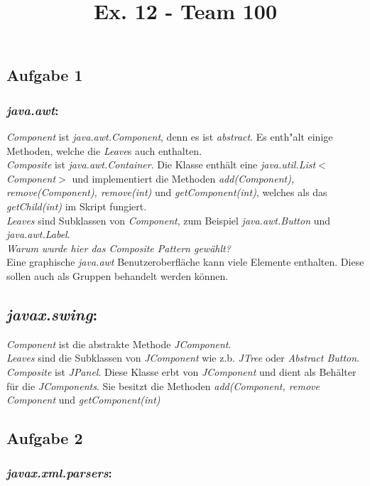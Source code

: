 \documentclass[a4paper]{article}
\title{Ex. 12 - Team 100}
\begin{document}
	\maketitle
\subsection*{Aufgabe 1}
\subsubsection*{\textit{java.awt}:}
\textit{Component} ist \textit{java.awt.Component}, denn es ist \textit{abstract}. Es enth"alt einige Methoden, welche die \textit{Leave}s auch enthalten. \\
\textit{Composite} ist \textit{java.awt.Container}. Die Klasse enthält eine \textit{java.util.List}$<$\textit{Component}$>$ und implementiert die 
Methoden \textit{add(Component), remove(Component), remove(int)} und \textit{getComponent(int)}, welches als das \textit{getChild(int)} im Skript fungiert. \\
\textit{Leaves} sind Subklassen von \textit{Component}, zum Beispiel \textit{java.awt.Button} und \textit{java.awt.Label}.\\
\emph{Warum wurde hier das \textit{Composite Pattern} gewählt?} \\
Eine graphische \textit{java.awt} Benutzeroberfläche kann viele Elemente enthalten. Diese sollen auch als Gruppen behandelt werden können.


\subsection{\textit{javax.swing}:}
\textit{Component} ist die abstrakte Methode \textit{JComponent}. \\
\textit{Leaves} sind die Subklassen von \textit{JComponent} wie z.b. \textit{JTree} oder \textit{Abstract Button}. \\
\textit{Composite} ist \textit{JPanel}. Diese Klasse erbt von \textit{JComponent} und dient als Behälter für die \textit{JComponents}. Sie besitzt die Methoden
\textit{add(Component, remove Component} und \textit{getComponent(int)}
\subsection*{Aufgabe 2}
	\subsubsection*{\textit{javax.xml.parsers}:}
	
\end{document}
